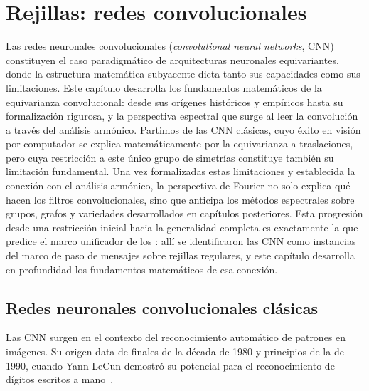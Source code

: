 \chapter{Rejillas: redes convolucionales}
\label{ch:grids}

\providecommand{\conv}{*}
\providecommand{\Ft}{\mathcal{F}}
\providecommand{\sinc}{\operatorname{sinc}}
\providecommand{\tr}{\operatorname{tr}}
\providecommand{\diag}{\operatorname{diag}}
\providecommand{\supp}{\operatorname{supp}}

Las redes neuronales convolucionales (\emph{convolutional neural networks},
CNN) constituyen el caso paradigm\'atico de arquitecturas neuronales
equivariantes, donde la estructura matem\'atica subyacente dicta tanto sus
capacidades como sus limitaciones. Este cap\'itulo desarrolla los fundamentos
matem\'aticos de la equivarianza convolucional: desde sus or\'igenes
hist\'oricos y emp\'iricos hasta su formalizaci\'on rigurosa, y la perspectiva
espectral que surge al leer la convoluci\'on a trav\'es del an\'alisis
arm\'onico. Partimos de las CNN cl\'asicas, cuyo \'exito en visi\'on por
computador se explica matem\'aticamente por la equivarianza a traslaciones, pero
cuya restricci\'on a este \'unico grupo de simetr\'ias constituye tambi\'en su
limitaci\'on fundamental. Una vez formalizadas estas limitaciones y establecida
la conexi\'on con el an\'alisis arm\'onico, la perspectiva de Fourier no solo
explica qu\'e hacen los filtros convolucionales, sino que anticipa los m\'etodos
espectrales sobre grupos, grafos y variedades desarrollados en cap\'itulos
posteriores. Esta progresi\'on desde una restricci\'on inicial hacia la
generalidad completa es exactamente la que predice el marco unificador de los
: all\'i se identificaron las CNN como instancias
del marco de paso de mensajes sobre rejillas regulares, y este cap\'itulo
desarrolla en profundidad los fundamentos matem\'aticos de esa conexi\'on.

\section{Redes neuronales convolucionales cl\'asicas}
\label{sec:grids:classical}

Las CNN surgen en el contexto del reconocimiento autom\'atico de patrones en
im\'agenes. Su origen data de finales de la d\'ecada de 1980 y principios de la
de 1990, cuando Yann LeCun demostr\'o su potencial para el reconocimiento de
d\'igitos escritos a mano~\citep{lecun1989}.

